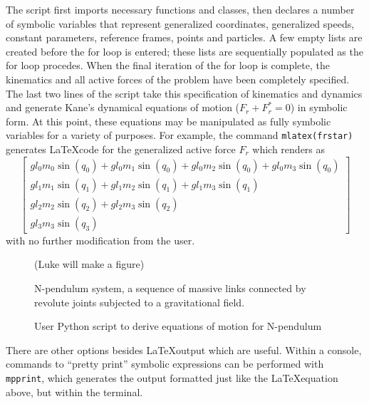 \documentclass[twocolumn,10pt]{asme2e}
\begin{document}
The script first imports necessary functions and classes, then declares a
number of symbolic variables that represent generalized coordinates,
generalized speeds, constant parameters, reference frames, points and
particles. A few empty lists are created before the for loop is entered; these
lists are sequentially populated as the for loop procedes.  When the final
iteration of the for loop is complete, the kinematics and all active forces of
the problem have been completely specified.  The last two lines of the script
take this specification of kinematics and dynamics and generate Kane's
dynamical equations of motion ($F_r + F_r^* = 0$) in symbolic form.  At this
point, these equations may be manipulated as fully symbolic variables for a
variety of purposes.  For example, the command \verb|mlatex(frstar)| generates
\LaTeX code for the generalized active force $F_r$ which renders as
\begin{equation}
\left[\begin{smallmatrix}g l_{0} m_{0} \operatorname{sin}\left(q_{0}\right) + g l_{0} m_{1} \operatorname{sin}\left(q_{0}\right) + g l_{0} m_{2} \operatorname{sin}\left(q_{0}\right) + g l_{0} m_{3} \operatorname{sin}\left(q_{0}\right)\\g l_{1} m_{1} \operatorname{sin}\left(q_{1}\right) + g l_{1} m_{2} \operatorname{sin}\left(q_{1}\right) + g l_{1} m_{3} \operatorname{sin}\left(q_{1}\right)\\g l_{2} m_{2} \operatorname{sin}\left(q_{2}\right) + g l_{2} m_{3} \operatorname{sin}\left(q_{2}\right)\\g l_{3} m_{3} \operatorname{sin}\left(q_{3}\right)\end{smallmatrix}\right]
\end{equation}
with no further modification from the user.

\begin{figure*}
(Luke will make a figure)
\caption{N-pendulum system, a sequence of massive links connected by revolute
joints subjected to a gravitational field.}
\label{fig:n_pendulum}
\end{figure*}

\begin{figure*}
\caption{User Python script to derive equations of motion for N-pendulum}
\label{fig:n_pendulum_source}
\end{figure*}

There are other options besides \LaTeX output which are useful.  Within a
console, commands to ``pretty print'' symbolic expressions can be performed
with \verb|mpprint|, which generates the output formatted just like the
\LaTeX equation above, but within the terminal.
\end{document}
